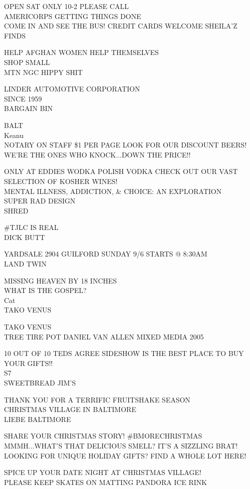 \documentclass[10pt,letterpaper]{article}
\begin{document}
OPEN SAT ONLY 10{-}2 PLEASE CALL\\
AMERICORPS GETTING THINGS DONE\\
COME IN AND SEE THE BUS!  CREDIT CARDS WELCOME SHEILA'Z FINDS

HELP AFGHAN WOMEN HELP THEMSELVES\\
SHOP SMALL\\
MTN NGC HIPPY SHIT

LINDER AUTOMOTIVE CORPORATION\\
SINCE 1959\\
BARGAIN BIN

BALT\\
Keanu\\
NOTARY ON STAFF \$1 PER PAGE LOOK FOR OUR DISCOUNT BEERS!  WE'RE THE ONES WHO KNOCK...DOWN THE PRICE!!

ONLY AT EDDIES WODKA POLISH VODKA CHECK OUT OUR VAST SELECTION OF KOSHER WINES!\\
MENTAL ILLNESS, ADDICTION, \& CHOICE: AN EXPLORATION\\
SUPER RAD DESIGN\\
SHRED

\#TJLC IS REAL\\
DICK BUTT

YARDSALE 2904 GUILFORD SUNDAY 9/6 STARTS @ 8:30AM\\
LAND TWIN

MISSING HEAVEN BY 18 INCHES\\
WHAT IS THE GOSPEL?\\
Cat\\
TAKO VENUS

TAKO VENUS\\
TREE TIRE POT DANIEL VAN ALLEN MIXED MEDIA 2005

10 OUT OF 10 TEDS AGREE SIDESHOW IS THE BEST PLACE TO BUY YOUR GIFTS!!\\
S7\\
SWEETBREAD JIM'S

THANK YOU FOR A TERRIFIC FRUITSHAKE SEASON\\
CHRISTMAS VILLAGE IN BALTIMORE\\
LIEBE BALTIMORE

SHARE YOUR CHRISTMAS STORY!  \#BMORECHRISTMAS\\
MMMH...WHAT'S THAT DELICIOUS SMELL?  IT'S A SIZZLING BRAT!\\
LOOKING FOR UNIQUE HOLIDAY GIFTS?  FIND A WHOLE LOT HERE!

SPICE UP YOUR DATE NIGHT AT CHRISTMAS VILLAGE!\\
PLEASE KEEP SKATES ON MATTING PANDORA ICE RINK
\end{document}
